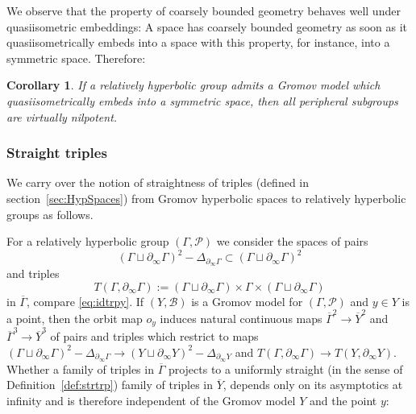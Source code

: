 \documentclass[12pt]{article}
\theoremstyle{boldplain}
\newtheorem{cor}[equation]{Corollary}
\theoremstyle{bolddefinition}
\numberwithin{equation}{section}
\def\Ga{\Gamma}
\def\De{\Delta}
\def\geo{\partial_{\infty}}
\def\ol{\overline}
\begin{document}
We observe that the property of coarsely bounded geometry behaves well under quasiisometric embeddings:
A space has coarsely bounded geometry as soon as it quasiisometrically embeds into a space with this property,
for instance, into a symmetric space. 
Therefore:
\begin{cor}\label{cor:DY}
If a  relatively hyperbolic group admits a Gromov model 
which quasiisometrically embeds into a symmetric space, 
then all peripheral subgroups are virtually nilpotent. 
\end{cor}



\subsubsection{Straight triples}
\label{sec:Gromov-straightness}


We carry over the notion of straightness of triples (defined in section~\ref{sec:HypSpaces}) 
from Gromov hyperbolic spaces to relatively hyperbolic groups as follows. 

For a relatively hyperbolic group $(\Ga,{\mathcal P})$
we consider the spaces of pairs
\begin{equation*}
(\Ga\sqcup\geo\Ga)^2 - \De_{\geo\Ga} \subset (\Ga\sqcup\geo\Ga)^2 
\end{equation*}
and triples
\begin{equation*}
T(\Ga,\geo\Ga) :=  (\Ga\sqcup\geo\Ga)\times\Ga\times(\Ga\sqcup\geo\Ga)
\end{equation*}
in $\ol\Ga$, 
compare \eqref{eq:idtrpy}.
If $(Y, {\mathcal B})$ is a 
Gromov model for $(\Ga,{\mathcal P})$ 
and $y\in Y$ is a point,
then the orbit map $o_y$ induces natural continuous maps 
$\ol\Ga^2\to\ol Y^2$ and $\ol\Ga^3\to\ol Y^3$ of pairs and triples
which restrict to maps 
$(\Ga\sqcup\geo\Ga)^2 - \De_{\geo\Ga} \to (Y\sqcup\geo Y)^2 - \De_{\geo Y}$ and $T(\Ga, \geo\Ga)\to T(Y, \geo Y)$.
Whether a family of triples in $\ol\Ga$ projects to a uniformly straight (in the sense of Definition~\ref{def:strtrp})
family of triples in $\ol Y$,
depends only on its asymptotics at infinity
and is therefore independent of the Gromov model $Y$ and the point $y$:
\end{document}
